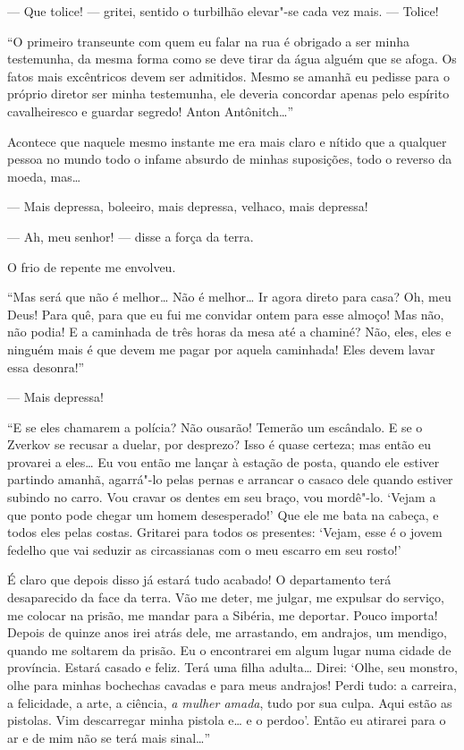 --- Que tolice! --- gritei, sentido o turbilhão elevar"-se cada vez mais. ---
Tolice!

“O primeiro transeunte com quem eu falar na rua é obrigado a ser minha
testemunha, da mesma forma como se deve tirar da água alguém que se
afoga. Os fatos mais excêntricos devem ser admitidos. Mesmo se amanhã
eu pedisse para o próprio diretor ser minha testemunha, ele deveria
concordar apenas pelo espírito cavalheiresco e guardar segredo! Anton
Antônitch\ldots{}”

Acontece que naquele mesmo instante me era mais claro e nítido que a
qualquer pessoa no mundo todo o infame absurdo de minhas suposições,
todo o reverso da moeda, mas\ldots{}

--- Mais depressa, boleeiro, mais depressa, velhaco, mais depressa!

--- Ah, meu senhor! --- disse a força da terra.

O frio de repente me envolveu.

“Mas será que não é melhor\ldots{} Não é melhor\ldots{} Ir agora direto para casa?
Oh, meu Deus! Para quê, para que eu fui me convidar ontem para esse
almoço! Mas não, não podia! E a caminhada de três horas da mesa até a
chaminé? Não, eles, eles e ninguém mais é que devem me pagar por aquela
caminhada! Eles devem lavar essa desonra!”

--- Mais depressa!

“E se eles chamarem a polícia? Não ousarão! Temerão um escândalo. E se o
Zverkov se recusar a duelar, por desprezo? Isso é quase certeza; mas então eu
provarei a eles\ldots{} Eu vou então me lançar à estação de posta, quando ele
estiver partindo amanhã, agarrá"-lo pelas pernas e arrancar o casaco dele quando
estiver subindo no carro. Vou cravar os dentes em seu braço, vou mordê"-lo.
‘Vejam a que ponto pode chegar um homem desesperado!’ Que ele me bata na
cabeça, e todos eles pelas costas.  Gritarei para todos os presentes: ‘Vejam,
esse é o jovem fedelho que vai seduzir as circassianas com o meu escarro em seu
rosto!’

É claro que depois disso já estará tudo acabado! O departamento terá
desaparecido da face da terra. Vão me deter, me julgar, me expulsar do serviço,
me colocar na prisão, me mandar para a Sibéria, me deportar.  Pouco importa!
Depois de quinze anos irei atrás dele, me arrastando, em andrajos, um mendigo,
quando me soltarem da prisão. Eu o encontrarei em algum lugar numa cidade de
província. Estará casado e feliz. Terá uma filha adulta\ldots{} Direi: ‘Olhe,
seu monstro, olhe para minhas bochechas cavadas e para meus andrajos! Perdi
tudo: a carreira, a felicidade, a arte, a ciência, \textit{a mulher amada},
tudo por sua culpa. Aqui estão as pistolas. Vim descarregar minha pistola
e\ldots{} e o perdoo’. Então eu atirarei para o ar e de mim não se terá mais
sinal\ldots{}”

